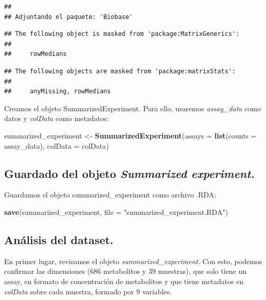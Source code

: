 \documentclass[
]{article}
\newenvironment{Shaded}{\begin{snugshade}}{\end{snugshade}}
\newcommand{\AttributeTok}[1]{\textcolor[rgb]{0.13,0.29,0.53}{#1}}
\newcommand{\FunctionTok}[1]{\textcolor[rgb]{0.13,0.29,0.53}{\textbf{#1}}}
\newcommand{\NormalTok}[1]{#1}
\newcommand{\OtherTok}[1]{\textcolor[rgb]{0.56,0.35,0.01}{#1}}
\newcommand{\StringTok}[1]{\textcolor[rgb]{0.31,0.60,0.02}{#1}}
\begin{document}
\begin{verbatim}
## 
## Adjuntando el paquete: 'Biobase'
\end{verbatim}

\begin{verbatim}
## The following object is masked from 'package:MatrixGenerics':
## 
##     rowMedians
\end{verbatim}

\begin{verbatim}
## The following objects are masked from 'package:matrixStats':
## 
##     anyMissing, rowMedians
\end{verbatim}

Creamos el objeto SummarizedExperiment. Para ello, usaremos
\emph{assay\_data} como datos y \emph{colData} como metadatos:

\begin{Shaded}
\begin{Highlighting}[]
\NormalTok{summarized\_experiment }\OtherTok{\textless{}{-}} \FunctionTok{SummarizedExperiment}\NormalTok{(}\AttributeTok{assays =} \FunctionTok{list}\NormalTok{(}\AttributeTok{counts =}\NormalTok{ assay\_data), }\AttributeTok{colData =}\NormalTok{ colData)}
\end{Highlighting}
\end{Shaded}

\subsection{\texorpdfstring{Guardado del objeto \emph{Summarized
experiment.}}{Guardado del objeto Summarized experiment.}}\label{guardado-del-objeto-summarized-experiment.}

Guardamos el objeto summarized\_experiment como archivo .RDA:

\begin{Shaded}
\begin{Highlighting}[]
\FunctionTok{save}\NormalTok{(summarized\_experiment, }\AttributeTok{file =} \StringTok{"summarized\_experiment.RDA"}\NormalTok{)}
\end{Highlighting}
\end{Shaded}

\subsection{Análisis del dataset.}\label{anuxe1lisis-del-dataset.}

En primer lugar, revisamos el objeto \emph{summarized\_experiment}. Con
esto, podemos confirmar las dimensiones (686 metabolitos y 39 muestras),
que solo tiene un assay, en formato de concentración de metabolitos y
que tiene metadatos en \emph{colData} sobre cada muestra, formado por 9
variables.
\end{document}
